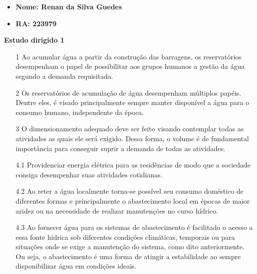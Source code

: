 \documentclass[a4paper, 12pt]{article}
\begin{document}
    \begin{itemize}
        \item\textbf{Nome: Renan da Silva Guedes}
        \item\textbf{RA: 223979}
    \end{itemize}
    
    \begin{center}
        \begin{large}
            \textbf{Estudo dirigido 1}
        \end{large}
    \end{center}
    
    \begin{enumerate}
        \item[1] Ao acumular água a partir da construção das barragens, os reservatórios desempenham o papel de possibilitar aos grupos humanos a gestão da água segundo a demanda requisitada. 
        
        \item[2] Os reservatórios de acumulação de água desempenham múltiplos papéis. Dentre eles, é visado principalmente sempre manter disponível a água para o consumo humano, independente da época.
        
        \item[3] O dimensionamento adequado deve ser feito visando contemplar todas as atividades as quais ele será exigido. Dessa forma, o volume é de fundamental importância para conseguir suprir a demanda de todas as atividades.
        
        \item[4.1] Providenciar energia elétrica para as residências de modo que a sociedade consiga desempenhar suas atividades cotidianas.
        
        \item[4.2] Ao reter a água localmente torna-se possível seu consumo doméstico de diferentes formas e 
        principalmente o abastecimento local em épocas de maior aridez ou na necessidade de realizar manutenções no curso hídrico.
        
        \item[4.3] Ao fornecer água para os sistemas de abastecimento é facilitado o acesso a essa fonte hídrica sob diferentes condições climáticas, temporais ou para situações onde se exige a manutenção do sistema, como dito anteriormente. Ou seja, o abastecimento é uma forma de atingir a estabilidade ao sempre disponibilizar água em condições ideais.
        

\end{enumerate}
\end{document}
